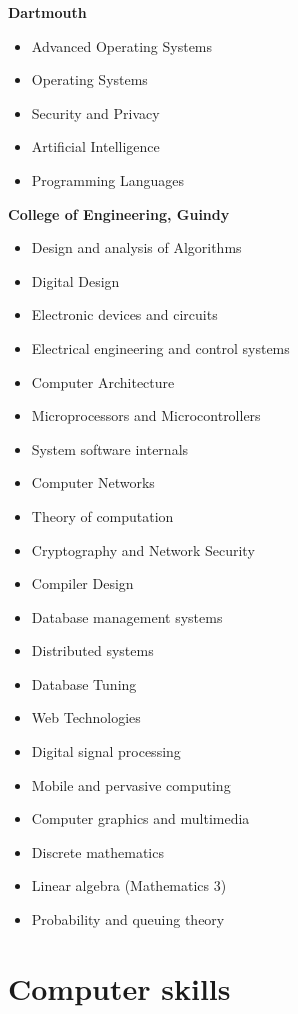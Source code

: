 \documentclass[11pt,a4paper,sans]{moderncv} %
\begin{document}
\textbf{Dartmouth}
\begin{itemize}
\item Advanced Operating Systems
\item Operating Systems
\item Security and Privacy
\item Artificial Intelligence
\item Programming Languages
\end{itemize}

\textbf{College of Engineering, Guindy}

\begin{itemize}
\item Design and analysis of Algorithms
\item Digital Design
\item Electronic devices and circuits
\item Electrical engineering and control systems
\item Computer Architecture
\item Microprocessors and Microcontrollers
\item System software internals
\item Computer Networks
\item Theory of computation
\item Cryptography and Network Security
\item Compiler Design
\item Database management systems
\item Distributed systems
\item Database Tuning
\item Web Technologies
\item Digital signal processing
\item Mobile and pervasive computing
\item Computer graphics and multimedia
\item Discrete mathematics
\item Linear algebra (Mathematics 3)
\item Probability and queuing theory

\end{itemize}
        

\section{Computer skills}
\end{document}
